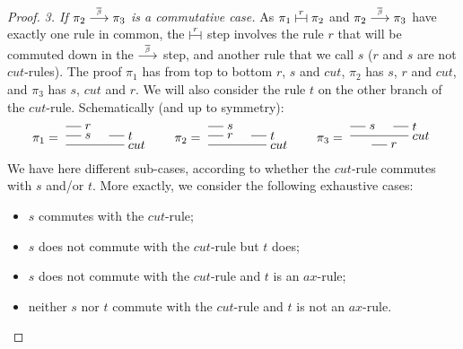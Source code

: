 \documentclass{lmcs}
\newcommand{\emptyforproof}{{\scriptsize\phantom{x}}}
\newcommand{\symboltext}[2]{\mathrel{\overset{\makebox[0pt]{\mbox{\normalfont\tiny\sffamily \ensuremath{#1}}}}{#2}}} %
\newcommand{\betabar}{\overline{\beta}}
\newcommand{\betabarto}{\symboltext{\betabar}{\longrightarrow}}
\newcommand{\vdashv}{\mathrel{\lower .22ex \hbox{$\vdash\!\dashv$}}}
\DeclareRobustCommand{\astsymbol}[1]{\mathrel{\ooalign{{$\vdashv$}\crcr{$\stackrel{#1}{\hphantom{\vdashv}\vphantom{\to}}$}}}}
\newcommand{\eqcone}{\astsymbol{r}} %
\newcommand*{\proofpar}[1]{\textit{#1}}
\begin{document}
\begin{proof}
\proofpar{3. If $\pi_2\betabarto\pi_3$ is a commutative case.}
As $\pi_1\eqcone\pi_2$ and $\pi_2\betabarto\pi_3$ have exactly one rule in common, the $\eqcone$ step involves the rule $r$ that will be commuted down in the $\betabarto$ step, and another rule that we call $s$ ($r$ and $s$ are not $cut$-rules).
The proof $\pi_1$ has from top to bottom $r$, $s$ and $cut$, $\pi_2$ has $s$, $r$ and $cut$, and $\pi_3$ has $s$, $cut$ and $r$.
We will also consider the rule $t$ on the other branch of the $cut$-rule.
Schematically (and up to symmetry):
\begin{equation*}
\pi_1=\text{\AxiomC{}\RightLabel{$r$}\UnaryInfC{\emptyforproof}\RightLabel{$s$}\UnaryInfC{\emptyforproof}\AxiomC{}\RightLabel{$t$}\UnaryInfC{\emptyforproof}\RightLabel{$cut$}\BinaryInfC{\emptyforproof}\DisplayProof}
\qquad
\pi_2=\text{\AxiomC{}\RightLabel{$s$}\UnaryInfC{\emptyforproof}\RightLabel{$r$}\UnaryInfC{\emptyforproof}\AxiomC{}\RightLabel{$t$}\UnaryInfC{\emptyforproof}\RightLabel{$cut$}\BinaryInfC{\emptyforproof}\DisplayProof}
\qquad
\pi_3=\text{\AxiomC{}\RightLabel{$s$}\UnaryInfC{\emptyforproof}\AxiomC{}\RightLabel{$t$}\UnaryInfC{\emptyforproof}\RightLabel{$cut$}\BinaryInfC{\emptyforproof}\RightLabel{$r$}\UnaryInfC{\emptyforproof}\DisplayProof}
\end{equation*}
We have here different sub-cases, according to whether the $cut$-rule commutes with $s$ and/or $t$.
More exactly, we consider the following exhaustive cases:
\begin{itemize}
\item
$s$ commutes with the $cut$-rule;
\item
$s$ does not commute with the $cut$-rule but $t$ does;
\item
$s$ does not commute with the $cut$-rule and $t$ is an $ax$-rule;
\item
neither $s$ nor $t$ commute with the $cut$-rule and $t$ is not an $ax$-rule.
\end{itemize}


\end{proof}
\end{document}
